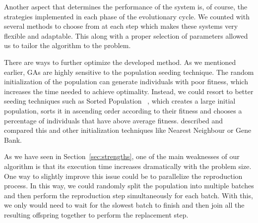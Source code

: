 \documentclass[anon]{CI}
\begin{document}
Another aspect that determines the performance of the system is, of course, the strategies implemented in each phase of the evolutionary cycle. We counted with several methods to choose from at each step which makes these systems very flexible and adaptable. This along with a proper selection of parameters allowed us to tailor the algorithm to the problem.

There are ways to further optimize the developed method. As we mentioned earlier, GAs are highly sensitive to the population seeding technique. The random initialization of the population can generate individuals with poor fitness, which increases the time needed to achieve optimality. Instead, we could resort to better seeding techniques such as Sorted Population ~\cite{yugay2008hybrid}, which creates a large initial population, sorts it in ascending order according to their fitness and chooses a percentage of individuals that have above average fitness. \cite{hassanat2018improved} described and compared this and other initialization techniques like Nearest Neighbour or Gene Bank.

As we have seen in Section~\ref{sec:strengths}, one of the main weaknesses of our algorithm is that its execution time increases dramatically with the problem size. One way to slightly improve this issue could be to parallelize the reproduction process. In this way, we could randomly split the population into multiple batches and then perform the reproduction step simultaneously for each batch. With this, we only would need to wait for the slowest batch to finish and then join all the resulting offspring together to perform the replacement step.


\clearpage


\end{document}
